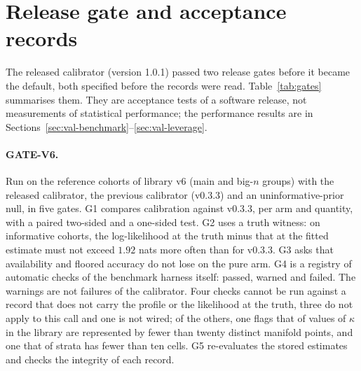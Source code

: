 \section{Release gate and acceptance records}\label{sec:si-gates}

The released calibrator (version 1.0.1) passed two release gates before it became the default, both specified before the
records were read. Table~\ref{tab:gates} summarises them. They are acceptance tests of a software release, not
measurements of statistical performance; the performance results are in Sections~\ref{sec:val-benchmark}--\ref{sec:val-leverage}.

\paragraph{GATE-V6.} Run on the  reference cohorts of library v6 (main and big-$n$ groups) with the released
calibrator, the previous calibrator (v0.3.3) and an uninformative-prior null, in five gates. G1 compares calibration
against v0.3.3, per arm and quantity, with a paired two-sided and a one-sided test. G2 uses a truth witness: on
informative cohorts, the log-likelihood at the truth minus that at the fitted estimate must not exceed $1.92$ nats more
often than for v0.3.3. G3 asks that availability and floored accuracy do not lose on the pure arm. G4 is a registry of
 automatic checks of the benchmark harness itself:  passed, 
warned and  failed. The warnings are not failures of the calibrator. Four checks cannot be run against
a record that does not carry the profile or the likelihood at the truth, three do not apply to this call and one is not wired; of the others, one flags that
 of  values of $\kappa$ in the library are represented by fewer than twenty distinct manifold points, and one that
 of  strata has fewer than ten cells. G5 re-evaluates the stored estimates and checks
the integrity of each record.

